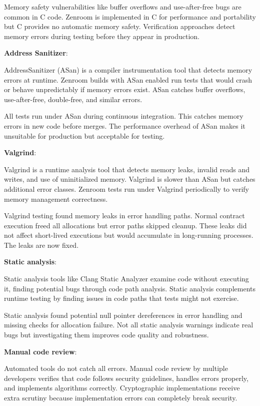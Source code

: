 Memory safety vulnerabilities like buffer overflows and use-after-free
bugs are common in C code. Zenroom is implemented in C for performance
and portability but C provides no automatic memory
safety. Verification approaches detect memory errors during testing
before they appear in production.

\textbf{Address Sanitizer}:

AddressSanitizer (ASan) is a compiler instrumentation tool that
detects memory errors at runtime. Zenroom builds with ASan enabled run
tests that would crash or behave unpredictably if memory errors
exist. ASan catches buffer overflows, use-after-free, double-free, and
similar errors.

All tests run under ASan during continuous integration. This catches
memory errors in new code before merges. The performance overhead of
ASan makes it unsuitable for production but acceptable for testing.

\textbf{Valgrind}:

Valgrind is a runtime analysis tool that detects memory leaks, invalid
reads and writes, and use of uninitialized memory. Valgrind is slower
than ASan but catches additional error classes. Zenroom tests run
under Valgrind periodically to verify memory management correctness.

Valgrind testing found memory leaks in error handling paths. Normal
contract execution freed all allocations but error paths skipped
cleanup. These leaks did not affect short-lived executions but would
accumulate in long-running processes. The leaks are now fixed.

\textbf{Static analysis}:

Static analysis tools like Clang Static Analyzer examine code without
executing it, finding potential bugs through code path
analysis. Static analysis complements runtime testing by finding
issues in code paths that tests might not exercise.

Static analysis found potential null pointer dereferences in error
handling and missing checks for allocation failure. Not all static
analysis warnings indicate real bugs but investigating them improves
code quality and robustness.

\textbf{Manual code review}:

Automated tools do not catch all errors. Manual code review by
multiple developers verifies that code follows security guidelines,
handles errors properly, and implements algorithms
correctly. Cryptographic implementations receive extra scrutiny
because implementation errors can completely break security.


